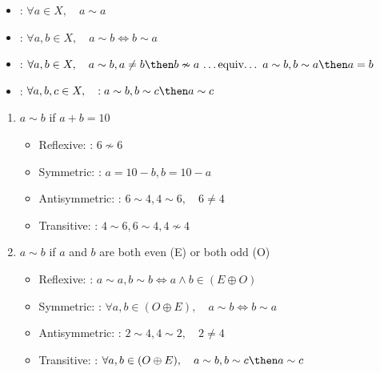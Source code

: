 \documentclass[basic, header]{nosvagor-notes}
\begin{document}
\begin{enumerate}[itemsep=5em]
\begin{itemize}
      \item
        :
        \(\forall a \in X, \quad a \sim a\)

      \item
        :
        \(\forall a,b \in X, \quad a \sim b \iff b \sim a \)

      \item
        :
        \(\forall a,b \in X, \quad a \sim b, a \neq b \then b \nsim a ~\text{\ldots equiv\ldots}~ a \sim b, b \sim a \then a = b\)

      \item
        :
        \(\forall a,b,c \in X, \quad : a \sim b, b \sim c \then a \sim c \)

    \end{itemize}
    \vspace{1em}

    \begin{enumerate}[itemsep=2.5em]
      \item $a \sim b$ if $a + b = 10$
        \begin{itemize}
          \item Reflexive: : \(6 \nsim 6\)
          \item Symmetric: : \(a = 10 - b, b = 10 - a\)
          \item Antisymmetric: : \(6 \sim 4, 4\sim 6, \quad 6 \neq 4\)
          \item Transitive: : \(4 \sim 6, 6 \sim 4, 4 \nsim 4\)
        \end{itemize}

      \item $a \sim b$ if $a$ and $b$ are both even (E) or both odd (O)
        \begin{itemize}
          \item Reflexive: : \(a \sim a, b \sim b \iff a \land b \in (E \oplus O) \)
          \item Symmetric: : \(\forall a,b \in (O \oplus E), \quad a \sim b \iff b \sim a\)
          \item Antisymmetric: : \(2 \sim 4, 4\sim 2, \quad 2 \neq 4 \)
          \item Transitive: : \(\forall a,b \in (O \oplus E ), \quad a \sim b, b \sim c \then a \sim c\)
        \end{itemize}


\end{enumerate}
\end{enumerate}
\end{document}
